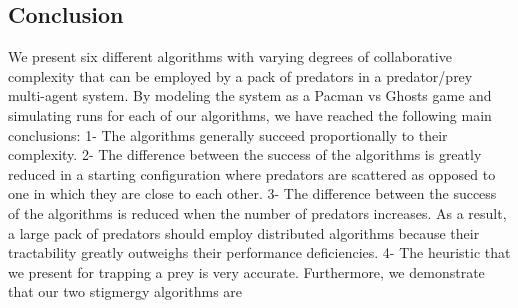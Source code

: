 \documentclass[11pt]{article}
\begin{document}
\begin{multicols}{2}

\section{Conclusion}
We present six different algorithms with varying degrees of collaborative complexity that can be employed by a pack of predators in a predator/prey multi-agent system. By modeling the system as a Pacman vs Ghosts game and simulating runs for each of our algorithms, we have reached the following main conclusions: 1- The algorithms generally succeed proportionally to their complexity. 2- The difference between the success of the algorithms is greatly reduced in a starting configuration where predators are scattered as opposed to one in which they are close to each other. 3- The difference between the success of the algorithms is reduced when the number of predators increases. As a result, a large pack of predators should employ distributed algorithms because their tractability greatly outweighs their performance deficiencies. 4- The heuristic that we present for trapping a prey is very accurate.
Furthermore, we demonstrate that our two stigmergy algorithms are 


\end{multicols}
\end{document}
